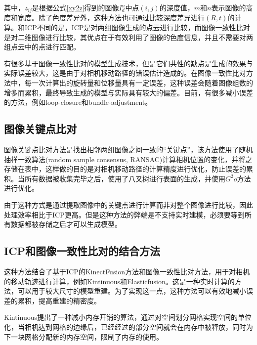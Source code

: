 \documentclass{llncs}
\begin{document}
\begin{CJK}{UTF8}{song}
其中，$z_{ij}$是根据公式\ref{xy2z}得到的图像$I^n_d$中点$(i,j)$的深度值，$m$和$n$表示图像的高度和宽度。除了色度差异外，这种方法也可通过比较深度差异进行$(R,t)$的计算\cite{Kerl2013Large}。和ICP不同的是，ICP是对两组图像生成的点云进行比较，而图像一致性比对是对二维图像进行比较，其优点在于有效利用了图像的色度信息，并且不需要对两组点云中的点进行匹配。

有很多基于图像一致性比对的模型生成技术\cite{6631104,DBLP:conf/iros/KerlSC13}，但是它们共性的缺点是生成的效果与实际误差较大，这是由于对相机移动路径的错误估计造成的。在图像一致性比对方法中，每一次计算出的旋转量和位移量具有一定误差，这种误差会随着图像组数的增多而累积，最终导致生成的模型与实际具有较大的偏差。目前，有很多减小误差的方法，例如loop-closure\cite{DBLP:conf/eccv/KahlerPM16,DBLP:journals/corr/abs-1708-00783}和bundle-adjustment\cite{DBLP:journals/ijcv/UrbanWLH17}。

	\subsection{图像关键点比对}

图像关键点比对方法是找出相邻两组图像之间一致的“关键点”，该方法使用了随机抽样一致算法(random sample consensus, RANSAC)计算相机位置的变化，并将之存储在表中\cite{DBLP:conf/icra/EndresHESCB12}，这样做的目的是对相机移动路径的计算精度进行优化，防止误差的累积。当所有数据被收集完毕之后，\cite{DBLP:conf/icra/EndresHESCB12}使用了八叉树进行表面的生成，并使用$G^2o$方法进行优化\cite{DBLP:conf/icra/KummerleGSKB11}。

由于这种方式是通过提取图像中的关键点进行计算而非对整个图像进行比较，因此处理效率相比于ICP更高。但是这种方法的弊端是不支持实时建模，必须要等到所有数据都被存储之后才可以生成模型。

	\subsection{ICP和图像一致性比对的结合方法}

这种方法结合了基于ICP的KinectFusion方法和图像一致性比对方法，用于对相机的移动轨迹进行计算，例如Kintinuous\cite{DBLP:conf/icra/WhelanJKLM13}和Elasticfusion\cite{DBLP:conf/rss/WhelanLSGD15}。这是一种实时计算的方法，可以用于较大尺寸的模型重建。为了实现这一点，这种方法可以有效地减小误差的累积，提高重建的精密度。

Kintinuous\cite{DBLP:conf/icra/WhelanJKLM13}提出了一种减小内存开销的算法，通过对空间划分网格实现空间的单位化，当相机达到网格的边缘后，已经经过的部分空间就会在内存中被释放，同时为下一块网格分配新的内存空间，限制了内存的使用。


\end{CJK}
\end{document}
